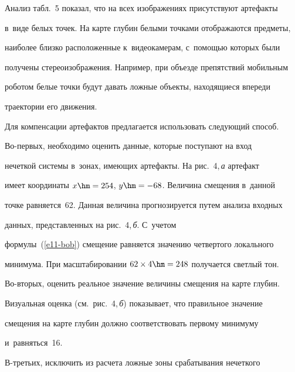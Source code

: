   


  Анализ табл.~5 показал, что на всех изображениях присутствуют артефакты 


в~виде белых точек. На карте глубин белыми точками отображаются предметы, 


наиболее близко расположенные к~видеокамерам, с~помощью которых были 


получены стереоизображения. Например, при объезде препятствий мобильным 


роботом белые точки будут давать ложные объекты, находящиеся впереди 


траектории его движения.


  


  Для компенсации артефактов предлагается использовать следующий способ. 


Во-пер\-вых, необходимо оценить данные, которые поступают на вход 


нечеткой системы в~зонах, имеющих артефакты. На рис.~4,\,\textit{а} артефакт 


имеет координаты $x \hm= 254$, $y \hm= - 68$. Величина смещения в~данной 


точке равняется~62. Данная величина прогнозируется путем анализа входных 


данных, представленных на рис.~4,\,\textit{б}. С~учетом  


формулы~(\ref{e11-bob}) смещение равняется значению четвертого локального 


минимума. При масштабировании $62\times4\hm=248$ получается светлый тон.








  


  Во-вторых, оценить реальное значение величины смещения на карте глубин. 


Визуальная оценка (см.\ рис.~4,\,\textit{б}) показывает, что правильное значение 


смещения на карте глубин должно соответствовать первому минимуму 


и~равняться~16.








  


  В-третьих, исключить из расчета ложные зоны срабатывания нечеткого 


